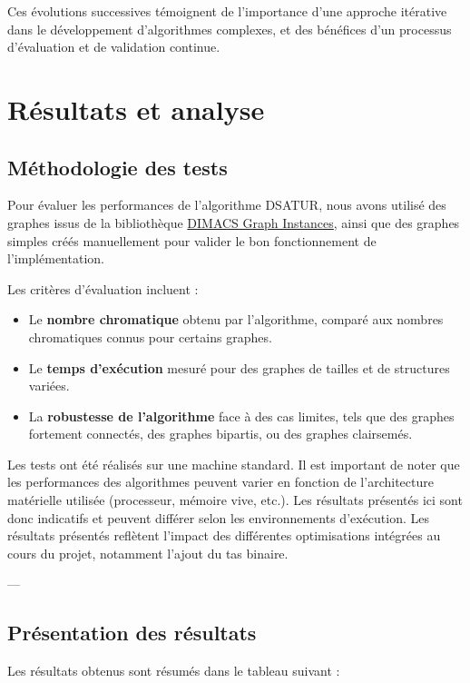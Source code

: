 \documentclass[11pt]{article}
\begin{document}
Ces évolutions successives témoignent de l’importance d’une approche itérative dans le développement d’algorithmes complexes, et des bénéfices d’un processus d’évaluation et de validation continue.

\section{Résultats et analyse}

\subsection{Méthodologie des tests}

Pour évaluer les performances de l’algorithme DSATUR, nous avons utilisé des graphes issus de la bibliothèque \href{https://mat.tepper.cmu.edu/COLOR/instances.html}{DIMACS Graph Instances}, ainsi que des graphes simples créés manuellement pour valider le bon fonctionnement de l’implémentation. 

Les critères d’évaluation incluent :
\begin{itemize}
    \item Le \textbf{nombre chromatique} obtenu par l’algorithme, comparé aux nombres chromatiques connus pour certains graphes.
    \item Le \textbf{temps d’exécution} mesuré pour des graphes de tailles et de structures variées.
    \item La \textbf{robustesse de l’algorithme} face à des cas limites, tels que des graphes fortement connectés, des graphes bipartis, ou des graphes clairsemés.
\end{itemize}

Les tests ont été réalisés sur une machine standard. Il est important de noter que les performances des algorithmes peuvent varier en fonction de l'architecture matérielle utilisée (processeur, mémoire vive, etc.). Les résultats présentés ici sont donc indicatifs et peuvent différer selon les environnements d'exécution.
 Les résultats présentés reflètent l’impact des différentes optimisations intégrées au cours du projet, notamment l’ajout du tas binaire.

---

\subsection{Présentation des résultats}

Les résultats obtenus sont résumés dans le tableau suivant :
\end{document}
